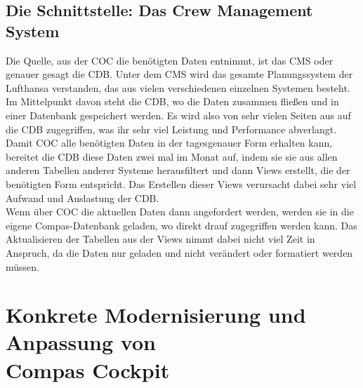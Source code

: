 \documentclass [12pt, a4paper, oneside, titlepage, ngerman]{article}
\begin{document}
\subsection {Die Schnittstelle: Das Crew Management System}
Die Quelle, aus der \ac{COC} die benötigten Daten entnimmt, ist das \ac{CMS} oder genauer gesagt die \ac{CDB}. Unter dem \ac{CMS} wird das gesamte Planungssystem der Lufthansa verstanden, das aus vielen verschiedenen einzelnen Systemen besteht. Im Mittelpunkt davon steht die \ac{CDB}, wo die Daten zusammen fließen und in einer Datenbank gespeichert werden. Es wird also von sehr vielen Seiten aus auf die \ac{CDB} zugegriffen, was ihr sehr viel Leistung und Performance abverlangt. \\
Damit \ac{COC} alle benötigten Daten in der tagesgenauer Form erhalten kann, bereitet die \ac{CDB} diese Daten zwei mal im Monat auf, indem sie sie aus allen anderen Tabellen anderer Systeme herausfiltert und dann Views erstellt, die der benötigten Form entspricht. Das Erstellen dieser Views verursacht dabei sehr viel Aufwand und Auslastung der \ac{CDB}.\\
Wenn über \ac{COC} die aktuellen Daten dann angefordert werden, werden sie in die eigene Compas-Datenbank geladen, wo direkt drauf zugegriffen werden kann. Das Aktualisieren der Tabellen aus der Views nimmt dabei nicht viel Zeit in Anspruch, da die Daten nur geladen und nicht verändert oder formatiert werden müssen.

\newpage
\section [Konkrete Modernisierung und Anpassung von Compas Cockpit]{Konkrete Modernisierung und Anpassung von \\ Compas Cockpit}
\end{document}
